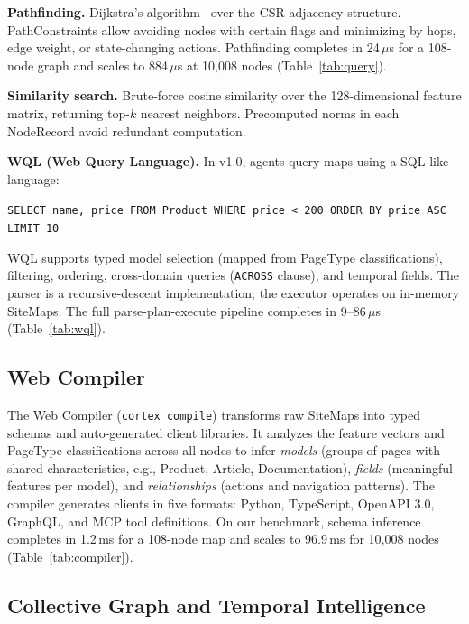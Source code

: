 \documentclass[10pt, twocolumn]{article}
\begin{document}
\textbf{Pathfinding.} Dijkstra's algorithm~\cite{dijkstra1959} over the CSR adjacency structure. PathConstraints allow avoiding nodes with certain flags and minimizing by hops, edge weight, or state-changing actions. Pathfinding completes in 24\,$\mu$s for a 108-node graph and scales to 884\,$\mu$s at 10{,}008 nodes (Table~\ref{tab:query}).

\textbf{Similarity search.} Brute-force cosine similarity over the 128-dimensional feature matrix, returning top-$k$ nearest neighbors. Precomputed norms in each NodeRecord avoid redundant computation.

\textbf{WQL (Web Query Language).} In v1.0, agents query maps using a SQL-like language:

{\small\texttt{SELECT name, price FROM Product WHERE price < 200 ORDER BY price ASC LIMIT 10}}

\noindent WQL supports typed model selection (mapped from PageType classifications), filtering, ordering, cross-domain queries (\texttt{ACROSS} clause), and temporal fields. The parser is a recursive-descent implementation; the executor operates on in-memory SiteMaps. The full parse-plan-execute pipeline completes in 9--86\,$\mu$s (Table~\ref{tab:wql}).

\subsection{Web Compiler}
\label{sec:compiler}

The Web Compiler (\texttt{cortex compile}) transforms raw SiteMaps into typed schemas and auto-generated client libraries. It analyzes the feature vectors and PageType classifications across all nodes to infer \emph{models} (groups of pages with shared characteristics, e.g., Product, Article, Documentation), \emph{fields} (meaningful features per model), and \emph{relationships} (actions and navigation patterns). The compiler generates clients in five formats: Python, TypeScript, OpenAPI 3.0, GraphQL, and MCP tool definitions. On our benchmark, schema inference completes in 1.2\,ms for a 108-node map and scales to 96.9\,ms for 10{,}008 nodes (Table~\ref{tab:compiler}).

\subsection{Collective Graph and Temporal Intelligence}
\label{sec:collective}
\end{document}
